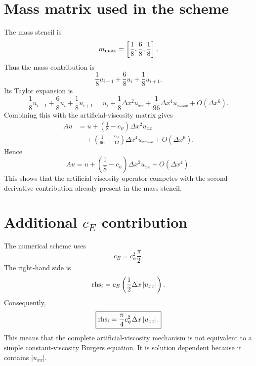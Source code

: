 \documentclass{mooiman_memo}
\begin{document}
\section{Mass matrix used in the scheme}
%
The mass stencil is
%
\begin{equation}
    m_{\rm mass}
    =
    \left[
        \frac18,\frac68,\frac18
    \right].
\end{equation}
%
Thus the mass contribution is
%
\begin{equation}
    \frac18u_{i-1}
    +\frac68u_i
    +\frac18u_{i+1}.
\end{equation}
%
Its Taylor expansion is
%
\begin{equation}
    \boxed{
    \frac18u_{i-1}
    +\frac68u_i
    +\frac18u_{i+1}
    =
    u_i
    +\frac18\Delta x^2u_{xx}
    +\frac1{96}\Delta x^4u_{xxxx}
    +O(\Delta x^6).
    }
\end{equation}
%
Combining this with the artificial-viscosity matrix gives
%
\begin{align}
    Au
    &=
    u
    +\left(\frac18-c_\psi\right)
      \Delta x^2u_{xx}
    \nonumber\\
    &\quad
    +\left(\frac1{96}-\frac{c_\psi}{12}\right)
      \Delta x^4u_{xxxx}
    +O(\Delta x^6).
\end{align}
%
Hence
%
\begin{equation}
    \boxed{
    Au=
    u+
    \left(\frac18-c_\psi\right)\Delta x^2u_{xx}
    +O(\Delta x^4).
    }
\end{equation}
%
This shows that the artificial-viscosity operator competes with the
second-derivative contribution already present in the mass stencil.
%
\section{Additional $c_E$ contribution}
%
The numerical scheme uses
%
\begin{equation}
    c_E=
    c_\psi^2\frac{\pi}{2}.
\end{equation}
%
The right-hand side is
%
\begin{equation}
    {\rm rhs}_i
    =
    c_E
    \left(
        \frac12\Delta x\,|u_{xx}|
    \right).
\end{equation}
%
Consequently,
%
\begin{equation}
    \boxed{
    {\rm rhs}_i=
    \frac{\pi}{4}
    c_\psi^2\Delta x\,|u_{xx}|.
    }
\end{equation}
%
This means that the complete artificial-viscosity mechanism is not
equivalent to a simple constant-viscosity Burgers equation. It is
solution dependent because it contains $|u_{xx}|$.
\end{document}
